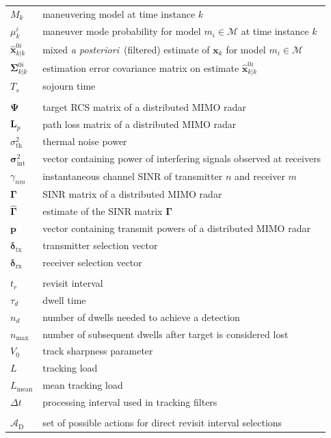 \documentclass[english, 12pt, a4paper, elec, utf8, a-1b, online]{aaltothesis}
\numberwithin{equation}{section}
\renewcommand{\vec}[1]{\mathbf{#1}}
\newcommand{\As}{\mathcal{A}}
\newcommand{\x}{\vec{x}_k}
\newcommand{\modeprob}{\mu_k^i}
\newcommand{\xmxinitcurr}{\hat{\vec{x}}^{0i}_{k|k}}
\newcommand{\ecovmxinitcurr}{\bm{\Sigma}^{0i}_{k|k}}
\newcommand{\Asdir}{\As_\text{D}}
\def\post{\textit{a posteriori}\ }
\newcommand{\mimm}{\mathcal{M}}
\newcommand{\dt}{\Delta t}
\newcommand{\thnoise}{\sigma^2_{\text{th}}}
\newcommand{\vpower}{\boldsymbol{p}}
\newcommand{\vintnoise}{\boldsymbol{\sigma}^2_{\text{int}}}
\newcommand{\esinr}{\gamma_{{nm}}}
\newcommand{\vsinrexp}{\boldsymbol{\Gamma}}
\newcommand{\vsinrb}{\widehat{\boldsymbol{\Gamma}}}
\newcommand{\vpl}{\vec{L}_p}
\newcommand{\vrcs}{\boldsymbol{\Psi}}
\newcommand{\vasvtx}{\boldsymbol{\delta}_{\text{tx}}}
\newcommand{\vasvrx}{\boldsymbol{\delta}_{\text{rx}}}
\newcommand{\ri}{t_r}
\begin{document}
\begin{longtable}{ll}
$M_k$ & maneuvering model at time instance $k$ \\
$\modeprob$ & maneuver mode probability for model $m_i \in \mimm$ at time instance $k$ \\
$\xmxinitcurr$ & mixed \post (filtered) estimate of $\x$ for model $m_i \in \mimm$\\
$\ecovmxinitcurr$ & estimation error covariance matrix on estimate $\xmxinitcurr$\\
$T_s$ & sojourn time \\
&\\
$\vrcs$ & target RCS matrix of a distributed MIMO radar \\
$\vpl$ & path loss matrix of a distributed MIMO radar\\
$\thnoise$ & thermal noise power \\
$\vintnoise$ & vector containing power of interfering signals observed at receivers \\
$\esinr$ & instantaneous channel SINR of transmitter $n$ and receiver $m$ \\
$\vsinrexp$ & SINR matrix of a distributed MIMO radar \\
$\vsinrb$ & estimate of the SINR matrix $\vsinrexp$ \\
$\vpower$ & vector containing transmit powers of a distributed MIMO radar \\
$\vasvtx$ & transmitter selection vector \\
$\vasvrx$ & receiver selection vector \\
&\\
$\ri$ & revisit interval \\
$\tau_d$ & dwell time \\
$n_d$ & number of dwells needed to achieve a detection \\
$n_\text{max}$ & number of subsequent dwells after target is considered lost \\
$V_0$ & track sharpness parameter \\
$L$ & tracking load \\
$L_\text{mean}$ & mean tracking load \\
$\dt$ & processing interval used in tracking filters \\
&\\
$\Asdir$ & set of possible actions for direct revisit interval selections \\

\end{longtable}
\end{document}
